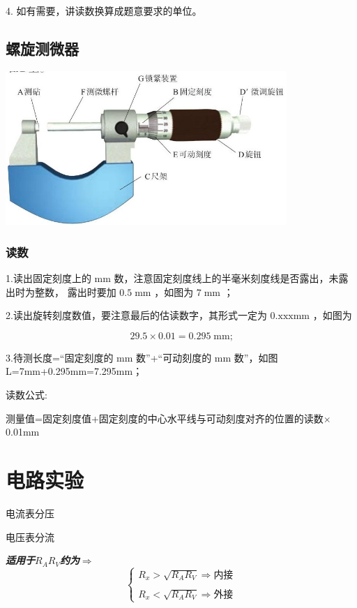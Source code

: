 \documentclass[10pt,cn]{elegantbook}
\begin{document}
4. 如有需要，讲读数换算成题意要求的单位。

\section{螺旋测微器}

      \begin{center}
	\includegraphics[max width=0.8\textwidth]{image/B64.jpg}
\end{center}

\subsection{读数}

1.读出固定刻度上的 mm 数，注意固定刻度线上的半毫米刻度线是否露出，未露出时为整数， 露出时要加 \({0.5}\mathrm{\;{mm}}\) ，如图为 \(7\mathrm{\;{mm}}\) ；

2.读出旋转刻度数值，要注意最后的估读数字，其形式一定为 \(0.\mathrm{{xxx}}\mathrm{{mm}}\) ，如图为

\[
{29.5} \times {0.01} = {0.295}\mathrm{\;{mm}}\text{;}
\]

3.待测长度=“固定刻度的 mm 数”+“可动刻度的 mm 数”，如图 L=7mm+0.295mm=7.295mm；

读数公式:

测量值=固定刻度值+固定刻度的中心水平线与可动刻度对齐的位置的读数$\times$0.01mm

\chapter{电路实验}

{\large 电流表分压}

{\large 电压表分流}

\textbf{\textit{适用于$R_{A}R_{V}$约为$\Rightarrow$}}
  $$    
\left\{
\begin{aligned}
	R_{x}>\sqrt{R_{A}R_{V}}\Rightarrow\text{内接} \\
	\\
	R_{x}<\sqrt{R_{A}R_{V}}\Rightarrow\text{外接} 
\end{aligned}
\right.
$$
\end{document}
